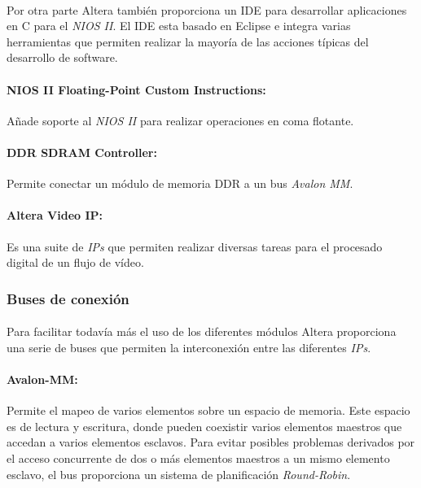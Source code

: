 \documentclass[a4paper,12pt,titlepage,final]{book}
\begin{document}
\paragraph{}
Por otra parte Altera también proporciona un IDE para desarrollar aplicaciones en C para el \textit{NIOS II}. El IDE esta basado en Eclipse e integra varias herramientas que permiten realizar la mayoría de las acciones típicas del desarrollo de software.

\paragraph{NIOS II Floating-Point Custom Instructions:}
Añade soporte al \textit{NIOS II} para realizar operaciones en coma flotante.

\paragraph{DDR SDRAM Controller:}
Permite conectar un módulo de memoria DDR a un bus \textit{Avalon MM}.

\paragraph{Altera Video IP:}
Es una suite de \textit{IPs} que permiten realizar diversas tareas para el procesado digital de un flujo de vídeo.

\subsubsection{Buses de conexión}

\paragraph{}
Para facilitar todavía más el uso de los diferentes módulos Altera proporciona una serie de buses que permiten la interconexión entre las diferentes \textit{IPs}.

\paragraph{Avalon-MM:}
Permite el mapeo de varios elementos sobre un espacio de memoria. Este espacio es de lectura y escritura, donde pueden coexistir varios elementos maestros que accedan a varios elementos esclavos. Para evitar posibles problemas derivados por el acceso concurrente de dos o más elementos maestros a un mismo elemento esclavo, el bus proporciona un sistema de planificación \textit{Round-Robin}.
\end{document}
